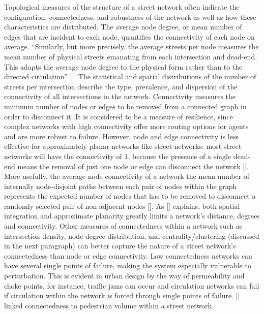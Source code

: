 Topological measures of the structure of a street network often indicate the configuration, connectedness, and robustness of the network as well as how these characteristics are distributed. The average node degree, or mean number of edges that are incident to each node, quantifies the connectivity of each node on average. “Similarly, but more precisely, the average streets per node measures the mean number of physical streets emanating from each intersection and dead-end. This adapts the average node degree to the physical form rather than to the directed circulation” [\cite{Boeing:2017}]. The statistical and spatial distributions of the number of streets per intersection describe the type, prevalence, and dispersion of the connectivity of all intersections in the network. Connectivity measures the minimum number of nodes or edges to be removed from a connected graph in order to disconnect it. It is considered to be a measure of resilience, since complex networks with high connectivity offer more routing options for agents and are more robust to failure. However, node and edge connectivity is less effective for approximately planar networks like street networks: most street networks will have the connectivity of 1, because the presence of a single dead-end means the removal of just one node or edge can disconnect the network [\cite{Boeing:2017}]. More usefully, the average node connectivity of a network the mean number of internally node-disjoint paths between each pair of nodes within the graph represents the expected number of nodes that has to be removed to disconnect a randomly selected pair of non-adjacent nodes [\cite{Beineke:2002}]. As [\cite{OSullivan:2014}] explains, both spatial integration and approximate planarity greatly limits a network’s distance, degrees and connectivity. Other measures of connectedness within a network such as intersection density, node degree distribution, and centrality/clustering (discussed in the next paragraph) can better capture the nature of a street network's connectedness than node or edge connectivity. Low connectedness networks can have several single points of failure, making the system especially vulnerable to perturbation. This is evident in urban design by the way of permeability and choke points, for instance, traffic jams can occur and circulation networks can fail if circulation within the network is forced through single points of failure. [\cite{Hajrasouliha:2015}] linked connectedness to pedestrian volume within a street network.

